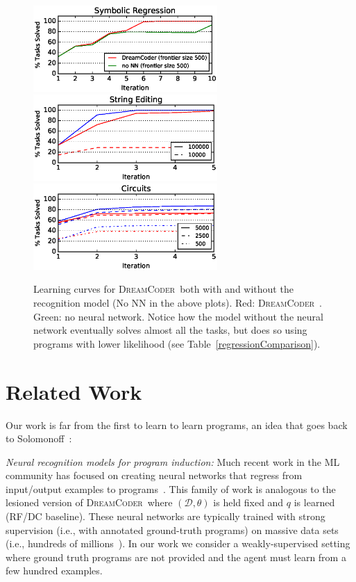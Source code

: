 \documentclass{article}
\newcommand{\system}{\textsc{DreamCoder}~}
\begin{document}
\begin{figure}\centering
  \includegraphics[width = 7cm]{figures/regression.eps}
  \includegraphics[width = 7cm]{figures/textLearningCurve.eps}
  \includegraphics[width = 7cm]{figures/circuitLearningCurve.eps}  
  \caption{Learning curves for \system both with and without the recognition model (No NN in the above plots). Red: \system. Green: no neural network. Notice how the model without the neural network eventually solves almost all the tasks, but does so using programs with lower likelihood (see Table~\ref{regressionComparison}).}\label{regressionLearningCurve}  
\end{figure}

\pagebreak
 \section{Related Work}
 Our work is far from the first to learn to learn programs,
 an  idea that goes back to Solomonoff~\cite{solomonoff1989system}:

 \noindent \emph{Neural recognition models for program induction:} Much recent work in the ML community has
 focused on creating neural networks that regress from
 input/output examples to programs~\cite{devlin2017robustfill,devlin2017neural,menon2013machine,balog2016deepcoder}. This family of work is analogous to the lesioned version of
 \system where $(\mathcal{D},\theta)$ is held fixed and $q$ is learned (RF/DC baseline).
 These neural networks are typically trained with strong supervision (i.e., with annotated ground-truth programs) on massive data sets (i.e., hundreds of millions~\cite{devlin2017robustfill}).
 In our work we consider a weakly-supervised setting where ground truth programs are not provided and
 the agent must learn from a few hundred examples.
 
\end{document}
